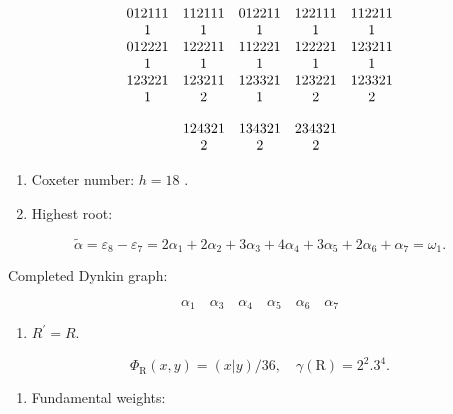 \[
\begin{array}{c c c c c} 0   1   2   1   1   1 & 1   1   2   1   1   1 & 0   1   2   2   1   1 & 1   2   2   1   1   1 & 1   1   2   2   1   1 \\ 1 & 1 & 1 & 1 & 1 \\ 0   1   2   2   2   1 & 1   2   2   2   1   1 & 1   1   2   2   2   1 & 1   2   2   2   2   1 & 1   2   3   2   1   1 \\ 1 & 1 & 1 & 1 & 1 \\ 1   2   3   2   2   1 & 1   2   3   2   1   1 & 1   2   3   3   2   1 & 1   2   3   2   2   1 & 1   2   3   3   2   1 \\ 1 & 2 & 1 & 2 & 2 \end{array}
\]

\[
\begin{array}{c c c} 1 2 4 3 2 1 & 1 3 4 3 2 1 & 2 3 4 3 2 1 \\ 2 & 2 & 2 \end{array}
\]

\begin{enumerate}
\def\labelenumi{(\Roman{enumi})}
\setcounter{enumi}{2}
\item
  Coxeter number: \(h = 18\) .
\item
  Highest root:
\end{enumerate}

\[
\tilde {\alpha} = \varepsilon_ {8} - \varepsilon_ {7} = 2 \alpha_ {1} + 2 \alpha_ {2} + 3 \alpha_ {3} + 4 \alpha_ {4} + 3 \alpha_ {5} + 2 \alpha_ {6} + \alpha_ {7} = \omega_ {1}.
\]

Completed Dynkin graph:

\[
\alpha_ {1} \quad \alpha_ {3} \quad \alpha_ {4} \quad \alpha_ {5} \quad \alpha_ {6} \quad \alpha_ {7}
\]

\begin{enumerate}
\def\labelenumi{(\Alph{enumi})}
\setcounter{enumi}{21}
\tightlist
\item
  \(R^{\prime} = R.\)
\end{enumerate}

\[
  \Phi_ {\mathrm{R}} (x, y) = (x | y) / 36, \quad \gamma (\mathrm{R}) = 2 ^ {2}. 3 ^ {4}.
\]

\begin{enumerate}
\def\labelenumi{(\Roman{enumi})}
\setcounter{enumi}{5}
\tightlist
\item
  Fundamental weights:
\end{enumerate}

